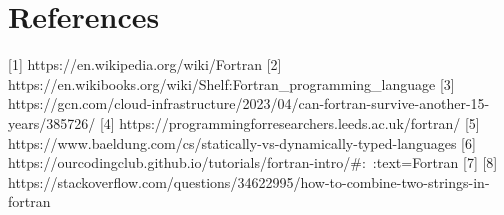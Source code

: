 \documentclass[12pt,a4paper]{scrartcl}
\begin{document}
\section{References}
[1] https://en.wikipedia.org/wiki/Fortran
[2] https://en.wikibooks.org/wiki/Shelf:Fortran_programming_language
[3] https://gcn.com/cloud-infrastructure/2023/04/can-fortran-survive-another-15-years/385726/
[4] https://programmingforresearchers.leeds.ac.uk/fortran/
[5] https://www.baeldung.com/cs/statically-vs-dynamically-typed-languages
[6] https://ourcodingclub.github.io/tutorials/fortran-intro/#:~:text=Fortran%
[7]
[8] https://stackoverflow.com/questions/34622995/how-to-combine-two-strings-in-fortran
\end{document}
